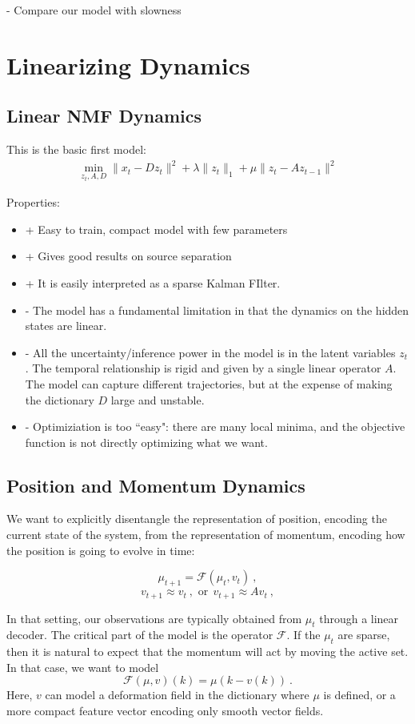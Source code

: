 \documentclass[11pt]{article} %
\begin{document}
- Compare our model with slowness


\section{Linearizing Dynamics}

\subsection{Linear NMF Dynamics}

This is the basic first model:
\begin{eqnarray}
\min_{z_t, A, D} \| x_t - D z_t \|^2 + \lambda \|z_t \|_1 + \mu \|z_t - A z_{t-1} \|^2
\end{eqnarray}

Properties:
\begin{itemize}
\item + Easy to train, compact model with few parameters
\item + Gives good results on source separation
\item + It is easily interpreted as a sparse Kalman FIlter.
\item - The model has a fundamental limitation in that the dynamics on the hidden states are linear. 
\item - All the uncertainty/inference power in the model is in the latent variables $z_t$. The temporal relationship is rigid and given by
a single linear operator $A$. The model can capture different trajectories, but at the expense of making the dictionary $D$ large and unstable.
\item - Optimiziation is too ``easy": there are many local minima, and the objective function is not directly optimizing what we want.
\end{itemize}

\subsection{Position and Momentum Dynamics}

We want to explicitly disentangle the representation of position, encoding 
the current state of the system, from the representation of momentum, encoding 
how the position is going to evolve in time:

$$\mu_{t+1} = \mathcal{F}(\mu_t, v_t)~,$$
$$v_{t+1} \approx v_{t}~,\mbox{ or} ~~v_{t+1} \approx A v_{t}~,$$

In that setting, our observations are typically obtained from $\mu_t$ through a linear decoder. 
The critical part of the model is the operator $\mathcal{F}$.
If the $\mu_t$ are sparse, then it is natural to expect that the momentum will act by moving the active set. 
In that case, we want to model 
$$\mathcal{F}(\mu, v)(k)= \mu(k - v(k))~.$$
Here, $v$ can model a deformation field in the dictionary where $\mu$ is defined, or a more compact
feature vector encoding only smooth vector fields.
\end{document}
